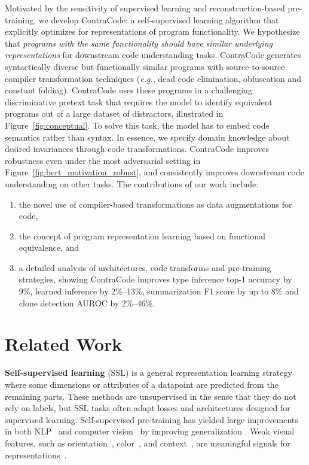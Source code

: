 \documentclass{article}
\newcommand{\ours}[0]{ContraCode}
\begin{document}
Motivated by the sensitivity of supervised learning and reconstruction-based pre-training, we develop \ours{}: a self-supervised learning algorithm that explicitly optimizes for representations of program functionality.
We hypothesize that \emph{programs with the same functionality should have similar underlying representations} for downstream code understanding tasks.
\ours{} generates syntactically diverse but functionally similar programs with source-to-source compiler transformation techniques (\textit{e.g.}, dead code elimination, obfuscation and constant folding).
\ours{} uses these programs in a challenging discriminative pretext task that requires the model to identify equivalent programs out of a large dataset of distractors, illustrated in Figure~\ref{fig:conceptual}. 
To solve this task, the model has to embed code semantics rather than syntax. 
In essence, we specify domain knowledge about desired invariances through code transformations. \ours{} improves robustness even under the most adversarial setting in Figure~\ref{fig:bert_motivation_robust}, and consistently improves downstream code understanding on other tasks.
The contributions of our work include:
\begin{enumerate}
    \item the novel use of compiler-based transformations as data augmentations for code,
    \item the concept of program representation learning based on functional equivalence, and
    \item a detailed analysis of architectures, code transforms and pre-training strategies, showing \ours{} improves type inference top-1 accuracy by 9\%, learned inference by 2\%--13\%, summarization F1 score by up to 8\% and clone detection AUROC by 2\%--46\%.
\end{enumerate}

\section{Related Work}
\textbf{Self-supervised learning} (SSL) is a general representation learning strategy where some dimensions or attributes of a datapoint are predicted from the remaining parts. These methods are unsupervised in the sense that they do not rely on labels, but SSL tasks often adapt losses and architectures designed for supervised learning.
Self-supervised pre-training has yielded large improvements in both NLP~\citep{nlp_howard2018universal,devlin2018bert,nlp_radford2018improving,nlp_radford2019language} and computer vision~\citep{weaksupervision_mahajan2018exploring} by improving generalization \citep{erhan2010does, hao2019visualizing}. 
Weak visual features, such as orientation~\citep{rotnet_gidaris2018unsupervised}, color~\citep{zhang2016colorful}, and context~\citep{pathak2016context}, are meaningful signals for representations~\citep{weaksupervision_mahajan2018exploring}.
\end{document}
